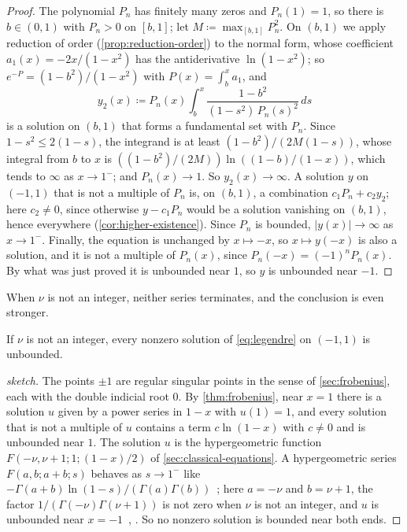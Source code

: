 \begin{proof}
The polynomial $P_n$ has finitely many zeros and $P_n(1)=1$, so there is $b\in(0,1)$ with $P_n>0$ on $[b,1]$; let $M\coloneqq\max_{[b,1]}P_n^2$. On $(b,1)$ we apply reduction of order (\cref{prop:reduction-order}) to the normal form, whose coefficient $a_1(x)=-2x/(1-x^2)$ has the antiderivative $\ln(1-x^2)$; so $e^{-P}=(1-b^2)/(1-x^2)$ with $P(x)=\int_b^xa_1$, and
\[
y_2(x)\coloneqq P_n(x)\int_b^x\frac{1-b^2}{(1-s^2)\,P_n(s)^2}\,ds
\]
is a solution on $(b,1)$ that forms a fundamental set with $P_n$. Since $1-s^2\le2(1-s)$, the integrand is at least $(1-b^2)/(2M(1-s))$, whose integral from $b$ to $x$ is $((1-b^2)/(2M))\ln((1-b)/(1-x))$, which tends to $\infty$ as $x\to1^-$; and $P_n(x)\to1$. So $y_2(x)\to\infty$. A solution $y$ on $(-1,1)$ that is not a multiple of $P_n$ is, on $(b,1)$, a combination $c_1P_n+c_2y_2$; here $c_2\ne0$, since otherwise $y-c_1P_n$ would be a solution vanishing on $(b,1)$, hence everywhere (\cref{cor:higher-existence}). Since $P_n$ is bounded, $|y(x)|\to\infty$ as $x\to1^-$. Finally, the equation is unchanged by $x\mapsto-x$, so $x\mapsto y(-x)$ is also a solution, and it is not a multiple of $P_n(x)$, since $P_n(-x)=(-1)^nP_n(x)$. By what was just proved it is unbounded near $1$, so $y$ is unbounded near $-1$.
\end{proof}

When $\nu$ is not an integer, neither series terminates, and the conclusion is even stronger.

\begin{proposition}
\label{prop:legendre-nonintegral}
If $\nu$ is not an integer, every nonzero solution of \eqref{eq:legendre} on $(-1,1)$ is unbounded.
\end{proposition}

\begin{proof}[sketch]
The points $\pm1$ are regular singular points in the sense of \cref{sec:frobenius}, each with the double indicial root $0$. By \cref{thm:frobenius}, near $x=1$ there is a solution $u$ given by a power series in $1-x$ with $u(1)=1$, and every solution that is not a multiple of $u$ contains a term $c\ln(1-x)$ with $c\ne0$ and is unbounded near $1$. The solution $u$ is the hypergeometric function $F(-\nu,\nu+1;1;(1-x)/2)$ of \cref{sec:classical-equations}. A hypergeometric series $F(a,b;a+b;s)$ behaves as $s\to1^-$ like $-\Gamma(a+b)\ln(1-s)/(\Gamma(a)\Gamma(b))$~\cite[Eq.~15.4.21]{olver2010nist}; here $a=-\nu$ and $b=\nu+1$, the factor $1/(\Gamma(-\nu)\Gamma(\nu+1))$ is not zero when $\nu$ is not an integer, and $u$ is unbounded near $x=-1$~\cite[Chap.~XV]{whittaker1927}, \cite[Chap.~7]{lebedev1972}. So no nonzero solution is bounded near both ends.
\end{proof}

